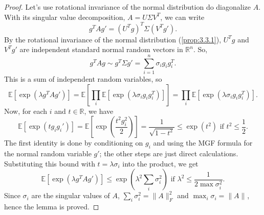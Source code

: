 \begin{proof}
Let's use rotational invariance of the normal distribution do diagonalize $A$. With its singular value 
decomposition, $A = U \Sigma V^T$, we can write 
\[ g^T Ag' = (U^T g)^T \Sigma (V^T g'). \]
By the rotational invariance of the normal distribution (\cref{prop:3.3.1}), $U^T g$ and $V^T g'$ are 
independent standard normal random vectors in $\mathbb{R}^n$. So, 
\[ g^T Ag \sim g^T \Sigma g' = \sum_{i = 1}^{n} \sigma_i g_ig_i^T. \]
This is a sum of independent random variables, so 
\[ \mathbb{E}\left[ \exp{(\lambda g^TAg')} \right] 
= \mathbb{E}\left[ \prod_{i}^{} \mathbb{E}\left[ \exp{(\lambda \sigma_i g_ig_i^T)} \right] \right] 
= \prod_{i}^{} \mathbb{E}\left[ \exp{(\lambda \sigma_i g_ig_i^T)} \right]. \]
Now, for each $i$ and $t \in \mathbb{R}$, we have 
\[ \mathbb{E}\left[ \exp{(tg_ig_i')} \right] = \mathbb{E}\left[ \exp{\left( \frac{t^2 g_i^2}{2} \right)}
\right] = \frac{1}{\sqrt{1 - t^2}} \leq \exp{(t^2)} \text{ if } t^2 \leq \frac{1}{2}. \]
The first identity is done by conditioning on $g_i$ and using the MGF formula for the normal random variable 
$g'$; the other steps are just direct calculations. Substituting this bound with $t = \lambda \sigma_i$ into 
the product, we get 
\[ \mathbb{E}\left[ \exp{(\lambda g^T Ag')} \right] \leq \exp{\left( \lambda^2 \sum_{i}^{} \sigma_i^2 \right)} 
\text{ if } \lambda^2 \leq \frac{1}{2 \max_{} \sigma_i^2}. \]
Since $\sigma_i$ are the singular values of $A$, $\sum_{i}^{} \sigma_i^2 = \lVert A \rVert_{F}^2$ and 
$\max_{i} \sigma_i = \lVert A \rVert_{}$, hence the lemma is proved.
\end{proof}


